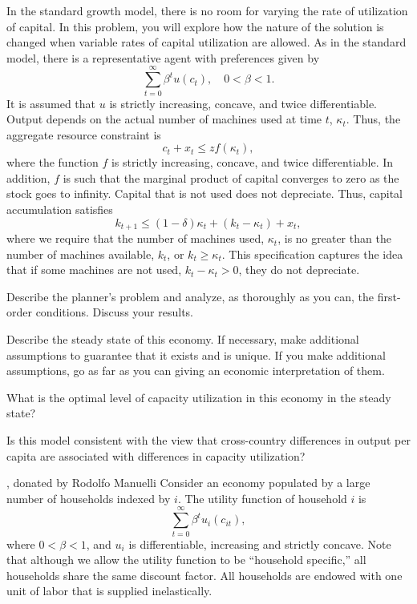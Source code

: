 \medskip\noindent
In the standard growth model,
 there is no room for varying the rate of utilization of capital.
  In this problem, you will explore how the nature of the solution is changed
 when variable rates of capital utilization are allowed.
\medskip
\noindent
As in the standard model, there is a representative agent with
preferences given by
$$\sum_{t=0}^\infty \beta^t u(c_t),   \quad 0 < \beta < 1.$$
It is assumed that $u$ is strictly increasing, concave, and twice
differentiable.  Output depends on the actual number of machines used at
 time $t$, $\kappa_t$.  Thus, the aggregate resource constraint is
$$c_t + x_t \leq zf(\kappa_t),$$
where the function $f$ is strictly increasing,
 concave, and twice differentiable.  In addition, $f$ is
such that the marginal product of capital converges to zero
 as the stock goes to infinity.
Capital that is not used does not depreciate.  Thus, capital
accumulation satisfies
$$k_{t+1} \leq (1-\delta)\kappa_t + (k_t - \kappa_t) + x_t,$$
where we require that the number of machines used, $\kappa_t$,
is no greater than the number of machines available, $k_t$, or
$k_t \geq \kappa_t$.
This specification captures the idea that if some machines are
not used, $k_t - \kappa_t>0$, %
they do not depreciate.
\medskip

 Describe the planner's problem and analyze, as
thoroughly as you can, the first-order conditions.  Discuss your results.
\medskip

 Describe the steady state of this economy.  If necessary,
make additional assumptions to guarantee that it exists and is unique.  If
you make additional assumptions, go as far as you can giving an economic
interpretation of them.
\medskip

 What is the optimal level of capacity utilization in
this economy in the steady state?
\medskip

 Is this model consistent with the view that cross-country
 differences in output per capita are associated with
differences in capacity utilization?


\medskip
{} , donated
by Rodolfo Manuelli
\medskip
\noindent
Consider an economy populated by a large number of households indexed by $i$.
The utility function of household $i$ is
$$ \sum_{t=0}^\infty \beta^t u_i(c_{it}),  $$
where $0<\beta<1$, and $u_i$ is differentiable, increasing and strictly concave.
Note that although we allow the utility function to be ``household specific,''
all households share the same discount factor.  All households are endowed with
one unit of labor that is supplied inelastically.

